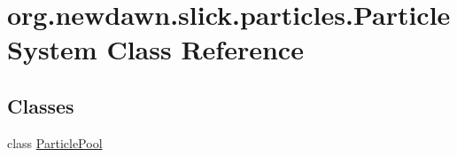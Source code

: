 \hypertarget{classorg_1_1newdawn_1_1slick_1_1particles_1_1_particle_system}{}\section{org.\+newdawn.\+slick.\+particles.\+Particle\+System Class Reference}
\label{classorg_1_1newdawn_1_1slick_1_1particles_1_1_particle_system}
\subsection*{Classes}
\begin{DoxyCompactItemize}
\item 
class \mbox{\hyperlink{classorg_1_1newdawn_1_1slick_1_1particles_1_1_particle_system_1_1_particle_pool}{Particle\+Pool}}
\end{DoxyCompactItemize}
